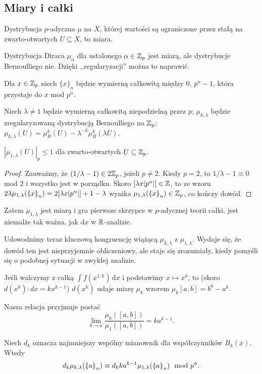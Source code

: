 \subsection{Miary i całki}
\begin{definicja}
	Dystrybucja $p$-adyczna $\mu$ na $X$, której wartości są ograniczone przez stałą na zwarto-otwartych $U\subseteq X$, to miara.
\end{definicja}

Dystrybucja Diraca $\mu_\alpha$ dla ustalonego $\alpha \in \mathbb Z_p$ jest miarą, ale dystrybucje Bernoulliego nie.
Dzięki ,,regularyzacji'' można to naprawić.

Dla $x \in \mathbb Z_p$ niech $\{x\}_n$ będzie wymierną całkowitą między $0$, $p^n-1$, która przystaje do $x$ mod $p^n$.

Niech $\lambda \neq 1$ będzie wymierną całkowitą niepodzielną przez $p$; $\mu_{k, \lambda}$ będzie zregularyzowaną dystrybucją Bernoulliego na $\mathbb Z_p$: $\mu_{k,\lambda}(U) = \mu_B^k(U) - \lambda^{-k} \mu_B^k (\lambda U)$.

\begin{fakt}
	$|\mu_{1, \lambda} (U)|_p \le 1$ dla zwarto-otwartych $U \subseteq \mathbb Z_p$.
\end{fakt}

\begin{proof}
	Zauważmy, że $(1/\lambda - 1) \in 2\mathbb Z_p$, jeżeli $p \neq 2$.
	Kiedy $p = 2$, to $1/\lambda - 1 \equiv 0$ mod $2$ i wszystko jest w porządku.
	Skoro $[\lambda x |p^n|] \in \mathbb Z$, to ze wzoru $2\lambda \mu_{1, \lambda}(\mathrel{\langle\mkern-3.85mu\mid\mkern-4mu} {x}\mathrel{\mkern-4mu\mid\mkern-3.85mu\rangle}_{n}) = 2[\lambda x |p^n|] + 1-\lambda$ wynika $\mu_{1, \lambda}(\mathrel{\langle\mkern-3.85mu\mid\mkern-4mu} {x}\mathrel{\mkern-4mu\mid\mkern-3.85mu\rangle}_{n}) \in \mathbb Z_p$, co kończy dowód.
\end{proof}

Zatem $\mu_{1,\lambda}$ jest miarą i gra pierwsze skrzypce w $p$-adycznej teorii całki, jest niemalże tak ważna, jak $\mathrm{d}x$ w $\mathbb R$-analizie.

Udowodnimy teraz kluczową kongruencję wiążącą $\mu_{k,\lambda}$ z $\mu_{1, \lambda}$.
Wydaje się, że dowód ten jest nieprzyjemnie obliczeniowy, ale staje się zrozumiały, kiedy pomyśli się o podobnej sytuacji w zwykłej analizie.

Jeśli walczymy z całką $\int f(x^{1:k}) \,\textrm{d}x$ i podstawimy $x \mapsto x^k$, to (skoro $d(x^k):dx = kx^{k-1}$) $d(x^k)$ udaje miarę $\mu_k$ wzorem $\mu_k[a,b] = b^k - a^k$.

Nasza relacja przyjmuje postać
\[
	\lim_{b \to a} \frac{\mu_k([a,b])}{\mu_1([a,b])} = ka^{k-1}.
\]

\begin{fakt}\label{heroine}
	Niech $d_k$ oznacza najmniejszy wspólny mianownik dla współczynników $B_k(x)$.
	Wtedy
	\[
		d_k \mu_{k, \lambda}(\mathrel{\langle\mkern-3.85mu\mid\mkern-4mu} {a}\mathrel{\mkern-4mu\mid\mkern-3.85mu\rangle}_{n}) \equiv d_k ka^{k-1} \mu_{1, \lambda}(\mathrel{\langle\mkern-3.85mu\mid\mkern-4mu} {a}\mathrel{\mkern-4mu\mid\mkern-3.85mu\rangle}_{n}) \mod {p^n}.
	\]
\end{fakt}

